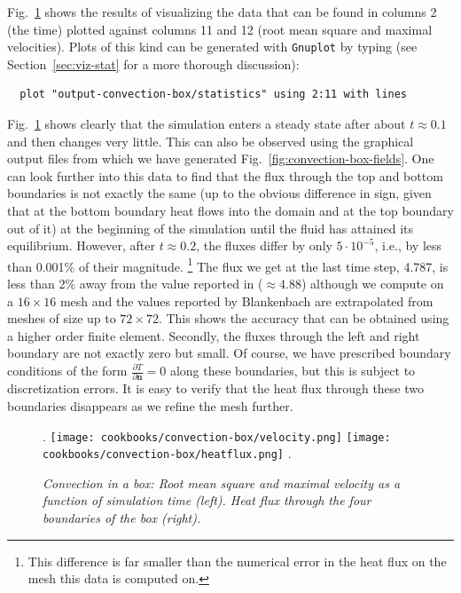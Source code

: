 \documentclass{article}
\begin{document}
Fig.~\ref{fig:convection-box-stats} shows the results of visualizing the data
that can be found in columns 2 (the time) plotted against columns 11 and 12
(root mean square and maximal velocities). Plots of this kind can be generated with
\texttt{Gnuplot} by typing (see Section~\ref{sec:viz-stat} for a more thorough
discussion):
\begin{verbatim}
  plot "output-convection-box/statistics" using 2:11 with lines
\end{verbatim}
Fig.~\ref{fig:convection-box-stats} shows clearly that the simulation
enters a steady state after about $t\approx 0.1$ and then changes very little. This can also be observed using the
graphical output files from which we have generated
Fig.~\ref{fig:convection-box-fields}. One can look further into this data to
find that the flux through the top and bottom boundaries is not exactly the same
(up to the obvious difference in sign, given that at the bottom boundary heat
flows into the domain and at the top boundary out of it) at the beginning of the
simulation until the fluid has attained its equilibrium. However, after
$t\approx 0.2$, the fluxes differ by only $5\cdot 10^{-5}$, i.e., by less than
0.001\% of their magnitude.%
\footnote{This difference is far smaller than the numerical error in the heat
flux on the mesh this data is computed on.}
The flux we get at the last time step, 4.787, is less than 2\% away from the
value reported in \cite{BBC89} ($\approx$4.88) although we compute on a $16\times 16$ mesh and
the values reported by Blankenbach are extrapolated from meshes of size up to
$72\times 72$. This shows the accuracy that can be obtained using a higher order
finite element. Secondly, the fluxes through the left and right boundary are not
exactly zero but small. Of course, we have prescribed boundary conditions of the
form $\frac{\partial T}{\partial \mathbf n}=0$ along these boundaries, but this
is subject to discretization errors. It is easy to verify that the heat flux
through these two boundaries disappears as we refine the mesh further.

\begin{figure}
\phantom.
\hfill
\texttt{[image: cookbooks/convection-box/velocity.png]}
\hfill
\texttt{[image: cookbooks/convection-box/heatflux.png]}
\hfill
\phantom.
\caption{\it Convection in a box: Root mean square and maximal velocity as a
function of simulation time (left). Heat flux through the four boundaries of
the box (right).}
\label{fig:convection-box-stats}
\end{figure}
\end{document}
